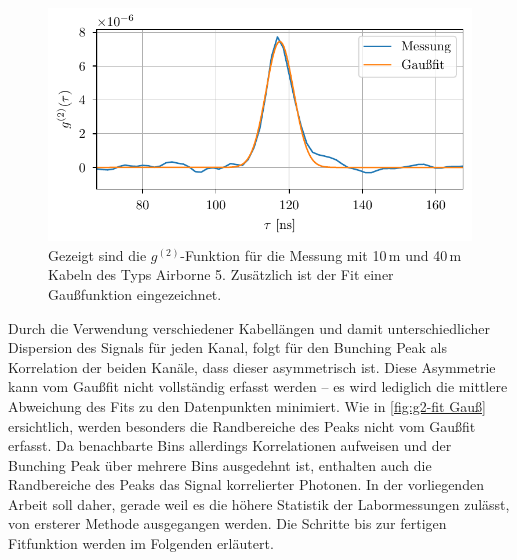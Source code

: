 \begin{figure}[h]
    \centering
    \includegraphics{images/Analysis/g2_gaussfit.pdf}
    \caption{Gezeigt sind die $g^{(2)}$-Funktion für die Messung mit 10\,m und 40\,m Kabeln des Typs Airborne 5. Zusätzlich ist der Fit einer Gaußfunktion eingezeichnet.}
    \label{fig:g2-fit Gauß}
\end{figure}
Durch die Verwendung verschiedener Kabellängen und damit unterschiedlicher Dispersion des Signals für jeden Kanal, folgt für den Bunching Peak als Korrelation der beiden Kanäle, dass dieser asymmetrisch ist. 
Diese Asymmetrie kann vom Gaußfit nicht vollständig erfasst werden -- es wird lediglich die mittlere Abweichung des Fits zu den Datenpunkten minimiert. 
Wie in \autoref{fig:g2-fit Gauß} ersichtlich, werden besonders die Randbereiche des Peaks nicht vom Gaußfit erfasst. 
Da benachbarte Bins allerdings Korrelationen aufweisen und der Bunching Peak über mehrere Bins ausgedehnt ist, enthalten auch die Randbereiche des Peaks das Signal korrelierter Photonen. 
In der vorliegenden Arbeit soll daher, gerade weil es die höhere Statistik der Labormessungen zulässt, von ersterer Methode ausgegangen werden. 
Die Schritte bis zur fertigen Fitfunktion werden im Folgenden erläutert.

